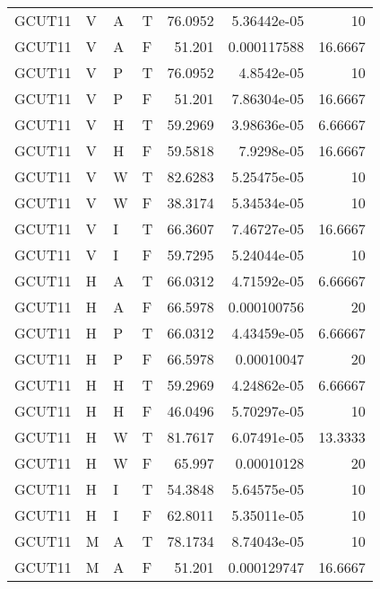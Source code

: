 \begin{longtable}{llllrrr}
    GCUT11   & V     & A     & T          & 76.0952    & 5.36442e-05 & 10       \\
    GCUT11   & V     & A     & F          & 51.201     & 0.000117588 & 16.6667  \\
    GCUT11   & V     & P     & T          & 76.0952    & 4.8542e-05  & 10       \\
    GCUT11   & V     & P     & F          & 51.201     & 7.86304e-05 & 16.6667  \\
    GCUT11   & V     & H     & T          & 59.2969    & 3.98636e-05 & 6.66667  \\
    GCUT11   & V     & H     & F          & 59.5818    & 7.9298e-05  & 16.6667  \\
    GCUT11   & V     & W     & T          & 82.6283    & 5.25475e-05 & 10       \\
    GCUT11   & V     & W     & F          & 38.3174    & 5.34534e-05 & 10       \\
    GCUT11   & V     & I     & T          & 66.3607    & 7.46727e-05 & 16.6667  \\
    GCUT11   & V     & I     & F          & 59.7295    & 5.24044e-05 & 10       \\
    GCUT11   & H     & A     & T          & 66.0312    & 4.71592e-05 & 6.66667  \\
    GCUT11   & H     & A     & F          & 66.5978    & 0.000100756 & 20       \\
    GCUT11   & H     & P     & T          & 66.0312    & 4.43459e-05 & 6.66667  \\
    GCUT11   & H     & P     & F          & 66.5978    & 0.00010047  & 20       \\
    GCUT11   & H     & H     & T          & 59.2969    & 4.24862e-05 & 6.66667  \\
    GCUT11   & H     & H     & F          & 46.0496    & 5.70297e-05 & 10       \\
    GCUT11   & H     & W     & T          & 81.7617    & 6.07491e-05 & 13.3333  \\
    GCUT11   & H     & W     & F          & 65.997     & 0.00010128  & 20       \\
    GCUT11   & H     & I     & T          & 54.3848    & 5.64575e-05 & 10       \\
    GCUT11   & H     & I     & F          & 62.8011    & 5.35011e-05 & 10       \\
    GCUT11   & M     & A     & T          & 78.1734    & 8.74043e-05 & 10       \\
    GCUT11   & M     & A     & F          & 51.201     & 0.000129747 & 16.6667  \\

\end{longtable}
